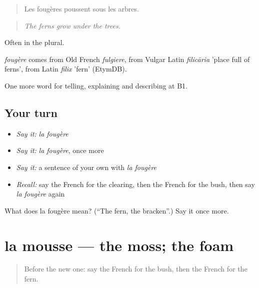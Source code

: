 \begin{quote}
Les fougères poussent sous les arbres.
\end{quote}

\begin{quote}
\emph{The ferns grow under the trees.}
\end{quote}

Often in the plural.

\begin{cousinweb}
\emph{fougère} comes from Old French \emph{fulgiere}, from Vulgar Latin \emph{filicāria} 'place full of ferns', from Latin \emph{filix} 'fern' (EtymDB).
\end{cousinweb}

\begin{grammarlens}[title={What you've built}]
One more word for telling, explaining and describing at B1.
\end{grammarlens}

\subsection*{Your turn}
\begin{itemize}
\raggedright
  \item \emph{Say it:} \emph{la fougère}
  \item \emph{Say it:} \emph{la fougère}, once more
  \item \emph{Say it:} a sentence of your own with \emph{la fougère}
  \item \emph{Recall:} say the French for the clearing, then the French for the bush, then say \emph{la fougère} again
\end{itemize}

\begin{tcolorbox}[breakable,colback=teal!4,colframe=teal!35!black,title={Before you move on}]
What does la fougère mean? (\textquotedblleft{}The fern, the bracken\textquotedblright{}.) Say it once more.
\end{tcolorbox}
\section[la mousse]{la mousse — the moss; the foam}

\label{lesson:FR-C457-mousse}



\begin{quote}
Before the new one: say the French for the bush, then the French for the fern.
\end{quote}

